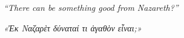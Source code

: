 \begin{pages}
\begin{Leftside}
		\pend
        \endnumbering
    \end{Leftside}

\end{pages} 
\Pages

\clearpage
\thispagestyle{empty}
\null\vfill
\settowidth{}
\begin{center}
\parbox{\longest}{%
  \raggedright{\huge\itshape%
    ``There can be something good from Nazareth?'' \par\bigskip
  }
}
\vfill\vfill
\clearpage\newpage
\end{center}
\newpage
\thispagestyle{empty}
\null\vfill
\settowidth{}
\begin{center}
\parbox{\longest}{%
  \raggedright{\huge\itshape%
    «Ἐκ Ναζαρὲτ δύναταί τι ἀγαθὸν εἶναι;» \par\bigskip
  }
}
\end{center}
\vfill\vfill